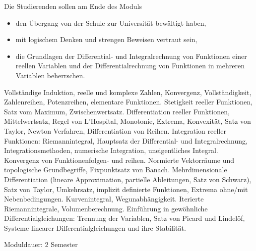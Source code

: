 \begin{module}
\begin{styleenv}
\end{styleenv}

\begin{learningoutcomes}
Die Studierenden sollen am Ende des Moduls

 \begin{itemize}\item den Übergang von der Schule zur Universität bewältigt haben,  \item mit logischem Denken und strengen Beweisen vertraut sein,  \item die Grundlagen der Differential- und Integralrechnung von Funktionen einer reellen Variablen und der Differentialrechnung von Funktionen in mehreren Variablen beherrschen.  \end{itemize}
\end{learningoutcomes}

\begin{content}
Vollständige Induktion, reelle und komplexe Zahlen, Konvergenz, Vollständigkeit, Zahlenreihen, Potenzreihen, elementare Funktionen. Stetigkeit reeller Funktionen, Satz vom Maximum, Zwischenwertsatz. Differentiation reeller Funktionen, Mittelwertsatz, Regel von L'Hospital, Monotonie, Extrema, Konvexität, Satz von Taylor, Newton Verfahren, Differentiation von Reihen. Integration reeller Funktionen: Riemannintegral, Hauptsatz der Differential- und Integralrechnung, Integrationsmethoden, numerische Integration, uneigentliches Integral. \newline
Konvergenz von Funktionenfolgen- und reihen. Normierte Vektorräume und topologische Grundbegriffe, Fixpunktsatz von Banach. Mehrdimensionale Differentiation (lineare Approximation, partielle Ableitungen, Satz von Schwarz), Satz von Taylor, Umkehrsatz, implizit definierte Funktionen, Extrema ohne/mit Nebenbedingungen. Kurvenintegral, Wegunabhängigkeit. Iterierte Riemannintegrale, Volumenberechnung. Einführung in gewöhnliche Differentialgleichungen: Trennung der Variablen, Satz von Picard und Lindelöf, Systeme linearer Differentialgleichungen und ihre Stabilität.


\end{content}

\begin{remarks}Moduldauer: 2 Semester

\end{remarks}

\end{module}

